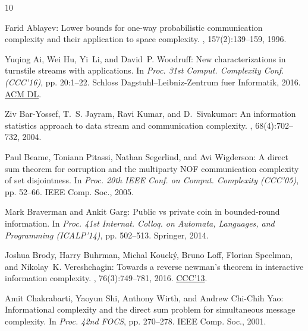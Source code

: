 \documentclass[11pt]{article}
\numberwithin{equation}{section}
\theoremstyle{definition}
\theoremstyle{plain}
\begin{document}
\tocrefpdfbookmark
\begin{thebibliography}{10}

{\sc Farid Ablayev}: Lower bounds for one-way probabilistic communication
  complexity and their application to space complexity.
, 157(2):139--159, 1996.
\newblock [\epfmtdoi{10.1016/0304-3975(95)00157-3}]

{\sc Yuqing Ai, Wei Hu, Yi~Li, and David~P. Woodruff}: New characterizations in
  turnstile streams with applications.
\newblock In {\em Proc. 31st Comput. Complexity Conf. (CCC'16)}, pp. 20:1--22.
  Schloss Dagstuhl--Leibniz-Zentrum fuer Informatik, 2016.
\newblock \href{https://dl.acm.org/doi/10.5555/2982445.2982465}{ACM DL}.

{\sc Ziv Bar-Yossef, T.~S. Jayram, Ravi Kumar, and D.~Sivakumar}: An
  information statistics approach to data stream and communication complexity.
, 68(4):702--732, 2004.

{\sc Paul Beame, Toniann Pitassi, Nathan Segerlind, and Avi Wigderson}: A
  direct sum theorem for corruption and the multiparty {NOF} communication
  complexity of set disjointness.
\newblock In {\em Proc. 20th IEEE Conf. on Comput. Complexity (CCC'05)}, pp.
  52--66. IEEE Comp. Soc., 2005.

{\sc Mark Braverman and Ankit Garg}: Public vs private coin in bounded-round
  information.
\newblock In {\em Proc. 41st Internat. Colloq. on Automata, Languages, and
  Programming (ICALP'14)}, pp. 502--513. Springer, 2014.
\newblock [\epfmtdoi{10.1007/978-3-662-43948-7\_42}]

{\sc Joshua Brody, Harry Buhrman, Michal Kouck{\'{y}}, Bruno Loff, Florian
  Speelman, and Nikolay~K. Vereshchagin}: Towards a reverse newman's theorem in
  interactive information complexity.
, 76(3):749--781, 2016.
\newblock \prelim \href{https://doi.org/10.1109/CCC.2013.12}{CCC'13}.
\newblock [\epfmtdoi{10.1007/s00453-015-0112-9}]

{\sc Amit Chakrabarti, Yaoyun Shi, Anthony Wirth, and Andrew Chi-Chih Yao}:
  Informational complexity and the direct sum problem for simultaneous message
  complexity.
\newblock In {\em Proc. 42nd FOCS}, pp. 270--278. IEEE Comp. Soc., 2001.


\end{thebibliography}
\end{document}
